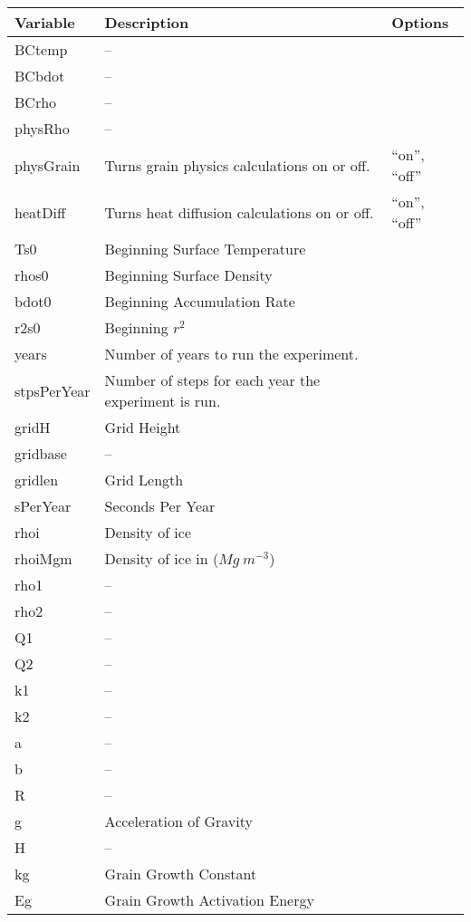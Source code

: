 \documentclass{article}
\begin{document}
\begin{tabular}{ |l| p{5cm} | p{3cm} |}
  \hline
  Variable &
  Description &
  Options \\
  \hline
  BCtemp &
  -- &
  \\
  \hline
 BCbdot &
  --  &
  \\
  \hline
   BCrho &
  -- &
  \\
  \hline
   physRho &
  -- &
  \\
  \hline
   physGrain &
  Turns grain physics calculations on or off. &
  ``on'', ``off''\\
\hline
   heatDiff &
  Turns heat diffusion calculations on or off. &
  ``on'', ``off''\\
  \hline
   Ts0 &
  Beginning Surface Temperature &
   \\
  \hline
   rhos0 &
  Beginning Surface Density &
  \\
  \hline
   bdot0 &
  Beginning Accumulation Rate &
  \\
  \hline
   r2s0 &
  Beginning \begin{math} r^2 \end{math} &
  \\
  \hline
   years &
  Number of years to run the experiment. &
  \\
  \hline
   stpsPerYear &
  Number of steps for each year the experiment is run. &
  \\
  \hline
  gridH &
  Grid Height &
  \\
  \hline
   gridbase &
  -- &
  \\
  \hline
  gridlen &
  Grid Length &
  \\
  \hline
  sPerYear &
  Seconds Per Year &
  \\
  \hline
  rhoi &
  Density of ice &
  \\
  \hline
  rhoiMgm &
  Density of ice in (\begin{math} Mg \: m^{-3} \end{math}) &
  \\
  \hline
   rho1 &
  -- &
  \\
  \hline
   rho2 &
  -- &
  \\
  \hline
   Q1 &
  -- &
  \\
  \hline
   Q2 &
  -- &
  \\
  \hline
  k1 &
  -- &
  \\
  \hline
   k2 &
  -- & 
 \\
  \hline
   a &
  -- &
  \\
  \hline
   b &
  -- &
  \\
  \hline
   R &
  -- &
  \\
  \hline
   g &
  Acceleration of Gravity &
  \\
  \hline
   H &
  -- &
  \\
  \hline
  kg &
  Grain Growth Constant &
  \\
  \hline
  Eg &
  Grain Growth Activation Energy &
  \\
  \hline
\end{tabular}
\end{document}
